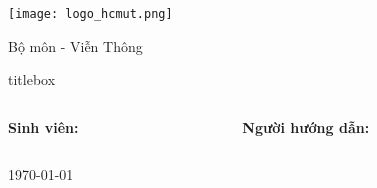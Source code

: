 
\begin{frame}[fragile]
    \centering


    \texttt{[image: logo\_hcmut.png]}

    \vspace{0.2em}

    {\footnotesize\KHOA}

    \vspace{0.2em}

    {\footnotesize Bộ môn - Viễn Thông}

    \vspace{0.5em}

    \begin{beamercolorbox}[rounded=true,shadow=true,sep=1em,center]{titlebox}
        \parbox{0.9\textwidth}{\centering\Large\bfseries \TENLUANVAN}
    \end{beamercolorbox}

    \vspace{0.3em}

    \parbox{0.85\textwidth}{\centering\large\emph{\THESISNAME}}

    \vfill %

    \begin{columns}[T, totalwidth=\textwidth]
        \begin{column}{0.48\textwidth}
            \raggedright
            {\scriptsize
            \textbf{Sinh viên:} \\
            \TENTACGIA
            }
        \end{column}
        \begin{column}{0.48\textwidth}
            \raggedleft
            {\scriptsize
            \textbf{Người hướng dẫn:} \\
            \TENNGUOIHUONGDAN
            }
        \end{column}
    \end{columns}

    \vspace{0.5cm}

    {\scriptsize \centering \today}

\end{frame}

